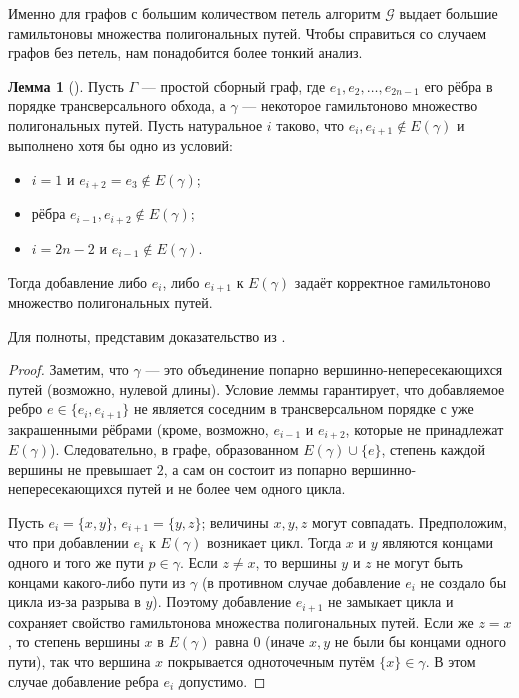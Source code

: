 \documentclass{article}
\theoremstyle{definition}
\newtheorem{lemma}[theorem]{Лемма}
\newcommand{\G}{\mathcal{G}}
\begin{document}
Именно для графов с большим количеством петель алгоритм $\G$ выдает большие гамильтоновы множества полигональных путей. Чтобы справиться со случаем графов без петель, нам понадобится более тонкий анализ. 

\begin{lemma}[\cite{MaksaevPreprint}]\label{lemma:greedy-cons-edges}
    Пусть $\Gamma$ — простой сборный граф, где $e_1,e_2,\ldots,e_{2n - 1}$ его рёбра в порядке трансверсального обхода, а $\gamma$ — некоторое гамильтоново множество полигональных путей. Пусть натуральное $i$ таково, что $e_{i}, e_{i+1} \notin E(\gamma)$ и выполнено хотя бы одно из условий:
    \begin{itemize}
        \item $i=1$ и $e_{i+2} = e_3 \notin E(\gamma)$;
        \item рёбра $e_{i-1}, e_{i+2} \notin E(\gamma)$;
        \item  $i=2n-2$ и $e_{i-1} \notin E(\gamma)$.
    \end{itemize} 

    Тогда добавление либо $e_i$, либо $e_{i + 1}$ к $E(\gamma)$ задаёт корректное гамильтоново множество полигональных путей.  
\end{lemma}

Для полноты, представим доказательство из \cite{MaksaevPreprint}.

\begin{proof}
Заметим, что $\gamma$ — это объединение попарно вершинно-непересекающихся путей (возможно, нулевой длины). Условие леммы гарантирует, что добавляемое ребро $e \in \{e_i, e_{i+1}\}$ не является соседним в трансверсальном порядке с уже закрашенными рёбрами (кроме, возможно, $e_{i-1}$ и $e_{i+2}$, которые не принадлежат $E(\gamma)$). Следовательно, в графе, образованном $E(\gamma) \cup \{e\}$, степень каждой вершины не превышает $2$, а сам он состоит из попарно вершинно-непересекающихся путей и не более чем одного цикла.

Пусть $e_i = \{x, y\}$, $e_{i+1} = \{y, z\}$; величины $x, y, z$ могут совпадать. Предположим, что при добавлении $e_i$ к $E(\gamma)$ возникает цикл. Тогда $x$ и $y$ являются концами одного и того же пути $p \in \gamma$. Если $z \neq x$, то вершины $y$ и $z$ не могут быть концами какого-либо пути из $\gamma$ (в противном случае добавление $e_i$ не создало бы цикла из-за разрыва в $y$). Поэтому добавление $e_{i+1}$ не замыкает цикла и сохраняет свойство гамильтонова множества полигональных путей. Если же $z = x$, то степень вершины $x$ в $E(\gamma)$ равна $0$ (иначе $x, y$ не были бы концами одного пути), так что вершина $x$ покрывается одноточечным путём $\{x\} \in \gamma$. В этом случае добавление ребра $e_i$ допустимо.
\end{proof}
\end{document}
